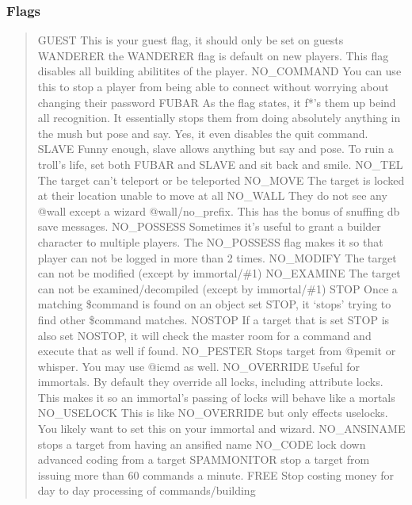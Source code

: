\documentclass[letterpaper,10pt,english]{sphinxmanual}
\begin{document}
\subsubsection{Flags}
\label{\detokenize{security:flags}}\begin{quote}

\sphinxAtStartPar
GUEST    \sphinxhyphen{} This is your guest flag, it should only be set on guests
WANDERER \sphinxhyphen{} the WANDERER flag is default on new players.  This flag disables all building abilitites of the player.
NO\_COMMAND \sphinxhyphen{} You can use this to stop a player from being able to connect without worrying about changing their password
FUBAR      \sphinxhyphen{} As the flag states, it f*’s them up beind all recognition.  It essentially stops them from doing absolutely anything in the mush but pose and say.  Yes, it even disables the quit command.
SLAVE      \sphinxhyphen{} Funny enough, slave allows anything but say and pose.  To ruin a troll’s life, set both FUBAR and SLAVE and sit back and smile.
NO\_TEL     \sphinxhyphen{} The target can’t teleport or be teleported
NO\_MOVE    \sphinxhyphen{} The target is locked at their location unable to move at all
NO\_WALL    \sphinxhyphen{} They do not see any @wall except a wizard @wall/no\_prefix.  This has the bonus of snuffing db save messages.
NO\_POSSESS \sphinxhyphen{} Sometimes it’s useful to grant a builder character to multiple players.  The NO\_POSSESS flag makes it so that player can not be logged in more than 2 times.
NO\_MODIFY  \sphinxhyphen{} The target can not be modified (except by immortal/\#1)
NO\_EXAMINE \sphinxhyphen{} The target can not be examined/decompiled (except by immortal/\#1)
STOP       \sphinxhyphen{} Once a matching \$command is found on an object set STOP, it ‘stops’ trying to find other \$command matches.
NOSTOP     \sphinxhyphen{} If a target that is set STOP is also set NOSTOP, it will check the master room for a command and execute that as well if found.
NO\_PESTER  \sphinxhyphen{} Stops target from @pemit or whisper.  You may use @icmd as well.
NO\_OVERRIDE \sphinxhyphen{} Useful for immortals.  By default they override all locks, including attribute locks.  This makes it so an immortal’s passing of locks will behave like a mortals NO\_USELOCK  \sphinxhyphen{} This is like NO\_OVERRIDE but only effects uselocks.  You likely want to set this on your immortal and wizard.
NO\_ANSINAME \sphinxhyphen{} stops a target from having an ansified name
NO\_CODE     \sphinxhyphen{} lock down advanced coding from a target
SPAMMONITOR \sphinxhyphen{} stop a target from issuing more than 60 commands a minute.
FREE        \sphinxhyphen{} Stop costing money for day to day processing of commands/building
\end{quote}
\end{document}
